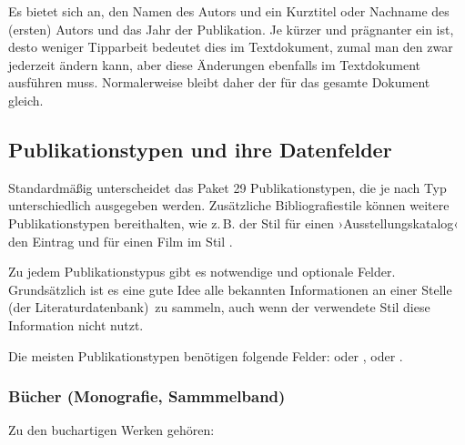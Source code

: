 Es bietet sich an, den Namen des Autors und ein Kurztitel oder Nachname des (ersten) Autors und das Jahr der Publikation. 
Je kürzer und prägnanter ein  ist, desto weniger Tipparbeit bedeutet dies im Textdokument, zumal man den  zwar jederzeit ändern kann, aber diese Änderungen ebenfalls im Textdokument ausführen muss. 
Normalerweise bleibt daher der  für das gesamte Dokument gleich.

\subsection{Publikationstypen und ihre Datenfelder}\label{lit:publikationstypus}
Standardmäßig unterscheidet das Paket  29 %
Publikationstypen, die je nach Typ unterschiedlich ausgegeben werden.
Zusätzliche Bibliografiestile können weitere Publikationstypen bereithalten,
wie z.\,B. der Stil  für einen ›Ausstellungskatalog‹ den Eintrag  und  für einen Film im Stil .

Zu jedem Publikationstypus gibt es notwendige und optionale Felder.
Grundsätzlich ist es eine gute Idee alle bekannten Informationen an einer Stelle (der Literaturdatenbank) zu sammeln,
auch wenn der verwendete Stil diese Information nicht nutzt.

Die meisten Publikationstypen benötigen folgende Felder:
 oder 
,
 oder .

\subsubsection{Bücher (Monografie, Sammmelband)}

Zu den buchartigen Werken gehören: 

